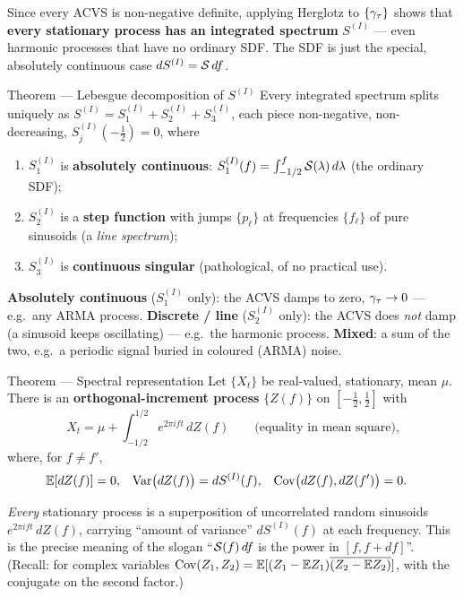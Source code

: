 \documentclass[11pt]{article}
\begin{document}
Since every ACVS is non-negative definite, applying Herglotz to $\{\gamma_\tau\}$ shows that \textbf{every stationary process has an integrated spectrum} $S^{(I)}$ --- even harmonic processes that have no ordinary SDF. The SDF is just the special, absolutely continuous case $dS^{(I)}=\mathcal{S}\,df$.

\begin{result}{Theorem --- Lebesgue decomposition of $S^{(I)}$}
Every integrated spectrum splits uniquely as $S^{(I)}=S^{(I)}_1+S^{(I)}_2+S^{(I)}_3$, each piece non-negative, non-decreasing, $S^{(I)}_j(-\tfrac12)=0$, where
\begin{enumerate}
  \item $S^{(I)}_1$ is \textbf{absolutely continuous}: $S^{(I)}_1(f)=\int_{-1/2}^{f}\mathcal{S}(\lambda)\,d\lambda$ (the ordinary SDF);
  \item $S^{(I)}_2$ is a \textbf{step function} with jumps $\{p_\ell\}$ at frequencies $\{f_\ell\}$ of pure sinusoids (a \emph{line spectrum});
  \item $S^{(I)}_3$ is \textbf{continuous singular} (pathological, of no practical use).
\end{enumerate}
\end{result}

\begin{intu}
\textbf{Absolutely continuous} ($S^{(I)}_1$ only): the ACVS damps to zero, $\gamma_\tau\to0$ --- e.g.\ any ARMA process. \textbf{Discrete / line} ($S^{(I)}_2$ only): the ACVS does \emph{not} damp (a sinusoid keeps oscillating) --- e.g.\ the harmonic process. \textbf{Mixed}: a sum of the two, e.g.\ a periodic signal buried in coloured (ARMA) noise.
\end{intu}

\begin{result}{Theorem --- Spectral representation}
Let $\{X_t\}$ be real-valued, stationary, mean $\mu$. There is an \textbf{orthogonal-increment process} $\{Z(f)\}$ on $[-\tfrac12,\tfrac12]$ with
\[
X_t=\mu+\int_{-1/2}^{1/2} e^{2\pi i f t}\,dZ(f)\qquad\text{(equality in mean square),}
\]
where, for $f\ne f'$,
\[
\begin{aligned}
\mathbb{E}[dZ(f)]&=0, & \operatorname{Var}\!\big(dZ(f)\big)&=dS^{(I)}(f), & \operatorname{Cov}\!\big(dZ(f),dZ(f')\big)&=0 .
\end{aligned}
\]
\end{result}

\begin{intu}
\emph{Every} stationary process is a superposition of uncorrelated random sinusoids $e^{2\pi i f t}\,dZ(f)$, carrying ``amount of variance'' $dS^{(I)}(f)$ at each frequency. This is the precise meaning of the slogan ``$\mathcal{S}(f)\,df$ is the power in $[f,f+df]$''. (Recall: for complex variables $\operatorname{Cov}(Z_1,Z_2)=\mathbb{E}[(Z_1-\mathbb{E} Z_1)\overline{(Z_2-\mathbb{E} Z_2)}]$, with the conjugate on the second factor.)
\end{intu}
\end{document}
